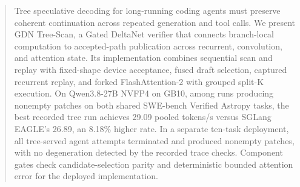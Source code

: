 \begin{abstract}
Tree speculative decoding for long-running coding agents must preserve coherent continuation across repeated generation and tool calls. We present GDN Tree-Scan, a Gated DeltaNet verifier that connects branch-local computation to accepted-path publication across recurrent, convolution, and attention state. Its implementation combines sequential scan and replay with fixed-shape device acceptance, fused draft selection, captured recurrent replay, and forked FlashAttention-2 with grouped split-K execution. On Qwen3.8-27B NVFP4 on GB10, among runs producing nonempty patches on both shared SWE-bench Verified Astropy tasks, the best recorded tree run achieves 29.09 pooled tokens/s versus SGLang EAGLE's 26.89, an 8.18\% higher rate. In a separate ten-task deployment, all tree-served agent attempts terminated and produced nonempty patches, with no degeneration detected by the recorded trace checks. Component gates check candidate-selection parity and deterministic bounded attention error for the deployed implementation.
\end{abstract}
